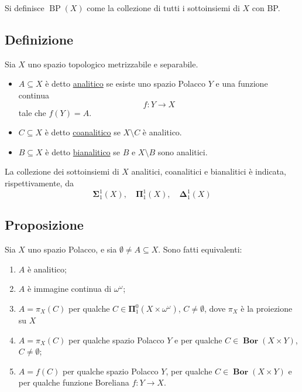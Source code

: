 \documentclass{article}
\newcommand{\1}{\mathds{1}}
\begin{document}
Si definisce \(\operatorname{BP}(X)\) come la collezione di tutti i sottoinsiemi di \(X\) con BP.
\subsection{Definizione}
\label{sec:orgcda100c}

Sia \(X\) uno spazio topologico metrizzabile e separabile.
\begin{itemize}
\item \(A \subseteq X\) è detto \uline{analitico} se esiste uno spazio Polacco \(Y\) e una funzione continua
\begin{equation*}
f:Y\to X
\end{equation*}
tale che \(f(Y) = A\).
\item \(C \subseteq X\) è detto \uline{coanalitico} se \(X\setminus C\) è analitico.
\item \(B \subseteq X\) è detto \uline{bianalitico} se \(B\) e \(X\setminus B\) sono analitici.
\end{itemize}

La collezione dei sottoinsiemi di \(X\) analitici, coanalitici e bianalitici è indicata, rispettivamente, da
\begin{equation*}
\bm{\Sigma}_{1}^{1}(X),\quad \bm{\Pi}_{1}^{1}(X),\quad \bm{\Delta}_{1}^{1}(X)
\end{equation*}
\subsection{Proposizione}
\label{sec:org1eb824f}

Sia \(X\) uno spazio Polacco, e sia \(\emptyset \neq A \subseteq X\). Sono fatti equivalenti:
\begin{enumerate}
\item \(A\) è analitico;
\item \(A\) è immagine continua di \(\omega^{\omega}\);
\item \(A= \pi_{X}(C)\) per qualche \(C \in \bm{\Pi}_{1}^{0}\left(X\times \omega^{\omega}\right)\), \(C\neq \emptyset\), dove \(\pi_{X}\) è la proiezione su \(X\)
\item \(A = \pi_{X}(C)\) per qualche spazio Polacco \(Y\) e per qualche \(C \in \bm{{\operatorname{Bor}}}(X\times Y)\), \(C\neq \emptyset\);
\item \(A=f(C)\) per qualche spazio Polacco \(Y\), per qualche \(C \in \bm{{\operatorname{Bor}}}(X\times Y)\) e per qualche funzione Boreliana \(f:Y\to X\).
\end{enumerate}
\end{document}
